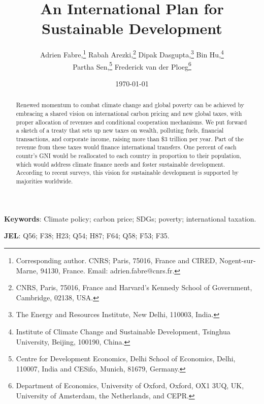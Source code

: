 \documentclass[12pt,english]{article}
\title{An International Plan for Sustainable Development
}
\author{Adrien Fabre,\footnote{Corresponding author. CNRS; Paris, 75016, France and CIRED, Nogent-sur-Marne, 94130, France. Email: adrien.fabre@cnrs.fr.} \;
Rabah Arezki,\footnote{CNRS, Paris, 75016, France and Harvard’s Kennedy School of Government, Cambridge, 02138, USA.} \;
Dipak Dasgupta,\footnote{The Energy and Resources Institute, New Delhi, 110003, India.} \;
Bin Hu,\footnote{Institute of Climate Change and Sustainable Development, Tsinghua University, Beijing, 100190, China.}  \\
Partha Sen,\footnote{Centre for Development Economics, Delhi School of Economics, Delhi, 110007, India and CESifo, Munich, 81679, Germany.}  \;
Frederick van der Ploeg\footnote{Department of Economics, University of Oxford, Oxford, OX1 3UQ, UK, University of Amsterdam, the Netherlands, and CEPR.} }
\date{\today{} %
}
\begin{document}
\maketitle

\clearpage
\begin{abstract}
  Renewed momentum to combat climate change and global poverty can be achieved by embracing a shared vision on international carbon pricing and new global taxes, with proper allocation of revenues and conditional cooperation mechanisms. We put forward a sketch of a treaty that sets up new taxes on wealth, polluting fuels, financial transactions, and corporate income, raising more than \$3 trillion per year. Part of the revenue from these taxes would finance international transfers. One percent of each countr's GNI would be reallocated to each country in proportion to their population, which would address climate finance needs and foster sustainable development. According to recent surveys, this vision for sustainable development is supported by majorities worldwide.
\end{abstract}

\textbf{Keywords}: Climate policy; carbon price; SDGs; poverty; international taxation.

\textbf{JEL}: Q56; F38; H23; Q54; H87; F64; Q58; F53; F35.
\end{document}
